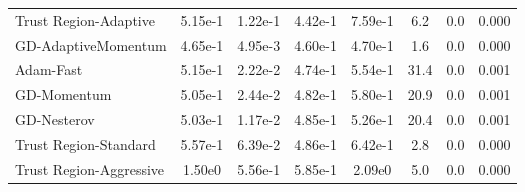 \documentclass{article}
\begin{document}
\begin{table}[htbp]
{\begin{tabular}{p{2.5cm}*{7}{c}}
Trust Region-Adaptive & 5.15e-1 & 1.22e-1 & 4.42e-1 & 7.59e-1 & 6.2 & 0.0 & 0.000 \\
GD-AdaptiveMomentum & 4.65e-1 & 4.95e-3 & 4.60e-1 & 4.70e-1 & 1.6 & 0.0 & 0.000 \\
Adam-Fast & 5.15e-1 & 2.22e-2 & 4.74e-1 & 5.54e-1 & 31.4 & 0.0 & 0.001 \\
GD-Momentum & 5.05e-1 & 2.44e-2 & 4.82e-1 & 5.80e-1 & 20.9 & 0.0 & 0.001 \\
GD-Nesterov & 5.03e-1 & 1.17e-2 & 4.85e-1 & 5.26e-1 & 20.4 & 0.0 & 0.001 \\
Trust Region-Standard & 5.57e-1 & 6.39e-2 & 4.86e-1 & 6.42e-1 & 2.8 & 0.0 & 0.000 \\
Trust Region-Aggressive & 1.50e0 & 5.56e-1 & 5.85e-1 & 2.09e0 & 5.0 & 0.0 & 0.000 \\
\bottomrule
\end{tabular}
}
\end{table}
\end{document}
